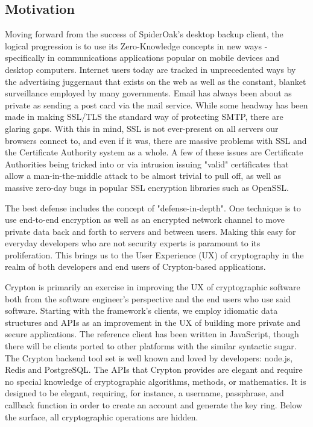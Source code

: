 \documentclass[conference]{IEEEtran}
\begin{document}
\subsection{Motivation}
Moving forward from the success of SpiderOak's desktop backup client,
the logical progression is to use its Zero-Knowledge concepts in new ways -
specifically in communications applications popular on mobile devices
and desktop computers. Internet users today are tracked in unprecedented
ways by the advertising juggernaut that exists on the web as well as the
constant, blanket surveillance employed by many governments.
Email has always been about as private as sending a post card via the mail
service. While some headway has been made in making SSL/TLS the standard
way of protecting SMTP, there are glaring gaps. With this in mind,
SSL is not ever-present on all servers our browsers connect to,
and even if it was, there are massive problems with SSL and the
Certificate Authority system as a whole. A few of these issues are
Certificate Authorities being tricked into or via intrusion issuing
"valid" certificates that allow a man-in-the-middle attack to be almost
trivial to pull off, as well as massive zero-day bugs in popular SSL
encryption libraries such as OpenSSL.

The best defense includes the concept of "defense-in-depth"\cite{defenseindepth}.
One technique is to use end-to-end encryption as well as an encrypted network
channel to move private data back and forth to servers and between users.
Making this easy for everyday developers who are not security experts is
paramount to its proliferation. This brings us to the User Experience (UX) of
cryptography in the realm of both developers and end users of Crypton-based
applications.

Crypton is primarily an exercise in improving the UX of cryptographic
software both from the software engineer's perspective and the
end users who use said software. Starting with the framework's clients,
we employ idiomatic data structures and APIs as an improvement in the UX of building
more private and secure applications. The reference client has been written in
JavaScript, though there will be clients ported to other platforms with the similar
syntactic sugar. The Crypton backend tool set is well known
and loved by developers: node.js, Redis and PostgreSQL. The APIs that
Crypton provides are elegant and require no special knowledge of cryptographic
algorithms, methods, or mathematics. It is designed to be elegant, requiring,
for instance, a username, passphrase, and callback function in order to create
an account and generate the key ring. Below the surface, all cryptographic
operations are hidden.
\end{document}
